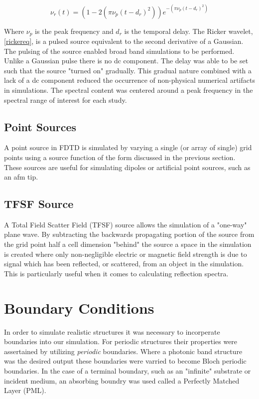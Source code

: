 \documentclass[./JimHeneghanDissertation.tex]{subfiles}
\begin{document}
				\begin{equation} \label{rickereq}
					\nu_{r}(t)=(1-2(\pi \nu_{p}(t-d_{r})^{2}))e^{-(\pi \nu_{p}(t-d_{r})^{2})}
				\end{equation}




			Where $\nu_{p}$ is the peak frequency and $d_{r}$ is the temporal delay. The Ricker wavelet, \eqref{rickereq}, is a pulsed source equivalent to the second derivative of a Gaussian. The pulsing of the source enabled broad band simulations to be performed. Unlike a Gaussian pulse there is no dc component. The delay was able to be set such that the source "turned on" gradually. This gradual nature combined with a lack of a dc component reduced the occurrence of non-physical numerical artifacts in simulations. The spectral content was centered around a peak frequency in the spectral range of interest for each study. 

			\subsection{Point Sources}
				A point source in FDTD is simulated by varying a single (or array of single) grid points using a source function of the form discussed in the previous section. These sources are useful for simulating dipoles or artificial point sources, such as an afm tip. 

			\subsection{TFSF Source}
				A Total Field Scatter Field (TFSF) source allows the simulation of a "one-way" plane wave. By subtracting the backwards propagating portion of the source from the grid point half a cell dimension "behind" the source a space in the simulation is created where only non-negligible electric or magnetic field strength is due to signal which has been reflected, or scattered, from an object in the simulation. This is particularly useful when it comes to calculating reflection spectra.
				 
		\section{Boundary Conditions}
			In order to simulate realistic structures it was necessary to incorperate boundaries into our simulation. For periodic structures their properties were assertained by utilizing \textit{periodic} boundaries. Where a photonic band structure was the desired output these boundaries were varried to become Bloch periodic boundaries. In the case of a terminal boundary, such as an "infinite" substrate or incident medium, an absorbing boundry was used called a Perfectly Matched Layer (PML). 
\end{document}
